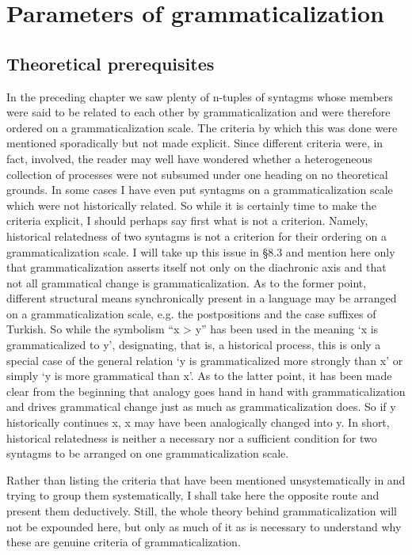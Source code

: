 \chapter{Parameters of grammaticalization}\label{chap:4}
\section{Theoretical prerequisites}\label{sec:4.1}

In the preceding chapter we saw plenty of n-tuples of syntagms whose members were said to be related to each other by grammaticalization and were therefore ordered on a grammaticalization scale. The criteria by which this was done were mentioned sporadically but not made explicit. Since different criteria were, in fact, involved, the reader may well have wondered whether a heterogeneous collection of processes were not subsumed under one heading on no theoretical grounds. In some cases I have even put syntagms on a grammaticalization scale which were not historically related. So while it is certainly time to make the criteria explicit, I should perhaps say first what is not a criterion. Namely, historical relatedness of two syntagms is not a criterion for their ordering on a grammaticalization scale. I will take up this issue in §8.3 and mention here only that grammaticalization asserts itself not only on the diachronic axis and that not all grammatical change is grammaticalization. As to the former point, different structural means synchronically present in a language may be arranged on a grammaticalization scale, e.g. the postpositions and the case suffixes of Turkish. So while the symbolism ``x {\textgreater} y'' has been used in the meaning ‘x is grammaticalized to y’, designating, that is, a historical process, this is only a special case of the general relation ‘y is grammaticalized more strongly than x’ or simply ‘y is more grammatical than x’. As to the latter point, it has been made clear from the beginning that analogy goes hand in hand with grammaticalization and drives grammatical change just as much as grammaticalization does. So if y historically continues x, x may have been analogically changed into y. In short, historical relatedness is neither a necessary nor a sufficient condition for two syntagms to be arranged on one grammaticalization scale.

Rather than listing the criteria that have been mentioned unsystematically in  and trying to group them systematically, I shall take here the opposite route and present them deductively. Still, the whole theory behind grammaticalization will not be expounded here, but only as much of it as is necessary to understand why these are genuine criteria of grammaticalization.

